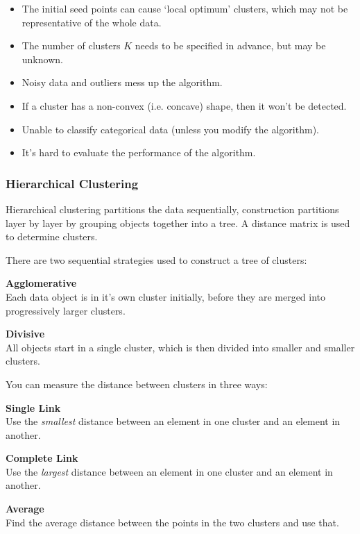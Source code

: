 
\begin{itemize}
  \item The initial seed points can cause `local optimum' clusters, which may
    not be representative of the whole data.
  \item The number of clusters $K$ needs to be specified in advance, but may be
    unknown.
  \item Noisy data and outliers mess up the algorithm.
  \item If a cluster has a non-convex (i.e. concave) shape, then it won't be
    detected.
  \item Unable to classify categorical data (unless you modify the algorithm).
  \item It's hard to evaluate the performance of the algorithm.
\end{itemize}

\subsubsection{Hierarchical Clustering}

Hierarchical clustering partitions the data sequentially, construction
partitions layer by layer by grouping objects together into a tree. A distance
matrix is used to determine clusters.

There are two sequential strategies used to construct a tree of clusters:


\begin{description}
  \item  \textbf{Agglomerative}\\
    Each data object is in it's own cluster initially, before they are merged
    into progressively larger clusters.
  \item \textbf{Divisive}\\
    All objects start in a single cluster, which is then divided into smaller
    and smaller clusters.
\end{description}

You can measure the distance between clusters in three ways:

\begin{description}
  \item \textbf{Single Link}\\
    Use the \textit{smallest} distance between an element in one cluster and an
    element in another.
  \item \textbf{Complete Link}\\
    Use the \textit{largest} distance between an element in one cluster and an
    element in another.
  \item \textbf{Average}\\
    Find the average distance between the points in the two clusters and use
    that.
\end{description}

